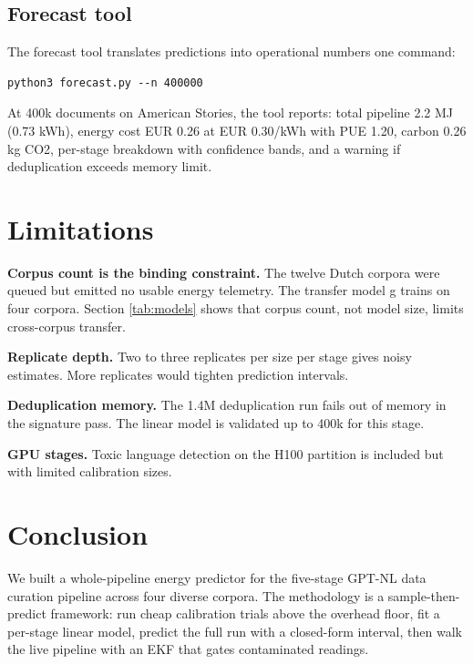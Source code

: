 \documentclass[12pt,a4paper]{article}
\begin{document}
\subsection{Forecast tool}

The forecast tool translates predictions into operational numbers one command:

\begin{verbatim}
python3 forecast.py --n 400000
\end{verbatim}

At 400k documents on American Stories, the tool reports: total pipeline 2.2 MJ (0.73 kWh), energy cost EUR 0.26 at EUR 0.30/kWh with PUE 1.20, carbon 0.26 kg CO2, per-stage breakdown with confidence bands, and a warning if deduplication exceeds memory limit.

\section{Limitations}
\label{sec:limitations}

\textbf{Corpus count is the binding constraint.} The twelve Dutch corpora were queued but emitted no usable energy telemetry. The transfer model g trains on four corpora. Section \ref{tab:models} shows that corpus count, not model size, limits cross-corpus transfer.

\textbf{Replicate depth.} Two to three replicates per size per stage gives noisy estimates. More replicates would tighten prediction intervals.

\textbf{Deduplication memory.} The 1.4M deduplication run fails out of memory in the signature pass. The linear model is validated up to 400k for this stage.

\textbf{GPU stages.} Toxic language detection on the H100 partition is included but with limited calibration sizes.

\section{Conclusion}
\label{sec:conclusion}

We built a whole-pipeline energy predictor for the five-stage GPT-NL data curation pipeline across four diverse corpora. The methodology is a sample-then-predict framework: run cheap calibration trials above the overhead floor, fit a per-stage linear model, predict the full run with a closed-form interval, then walk the live pipeline with an EKF that gates contaminated readings.
\end{document}
